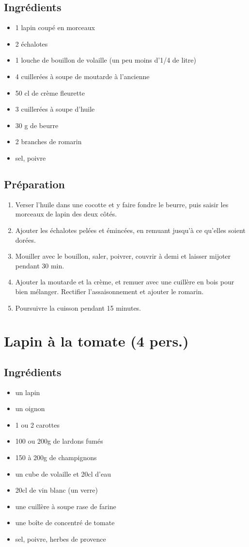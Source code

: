 \subsection*{Ingrédients}
\begin{itemize}
\item 1 lapin coupé en morceaux
\item 2 échalotes
\item 1 louche de bouillon de volaille (un peu moins d'1/4 de litre)
\item 4 cuillerées à soupe de moutarde à l'ancienne
\item 50 cl de crème fleurette
\item 3 cuillerées à soupe d'huile
\item 30 g de beurre
\item 2 branches de romarin
\item sel, poivre
\end{itemize}

\subsection*{Préparation}
\begin{enumerate}
\item Verser l'huile dans une cocotte et y faire fondre le beurre, puis saisir les morceaux de lapin des deux côtés.
\item Ajouter les échalotes pelées et émincées, en remuant jusqu'à ce qu'elles soient dorées.
\item Mouiller avec le bouillon, saler, poivrer, couvrir à demi et laisser mijoter pendant 30 min.
\item Ajouter la moutarde et la crème, et remuer avec une cuillère en bois pour bien mélanger. Rectifier l'assaisonnement et ajouter le romarin.
\item Poursuivre la cuisson pendant 15 minutes.
\end{enumerate}


\newpage
\section{Lapin à la tomate (4 pers.)}
\subsection*{Ingrédients}
\begin{itemize}
\item un lapin
\item un oignon
\item 1 ou 2 carottes
\item 100 ou 200g de lardons fumés
\item 150 à 200g de champignons
\item un cube de volaille et 20cl d'eau
\item 20cl de vin blanc (un verre)
\item une cuillère à soupe rase de farine
\item une boîte de concentré de tomate
\item sel, poivre, herbes de provence
\end{itemize}

